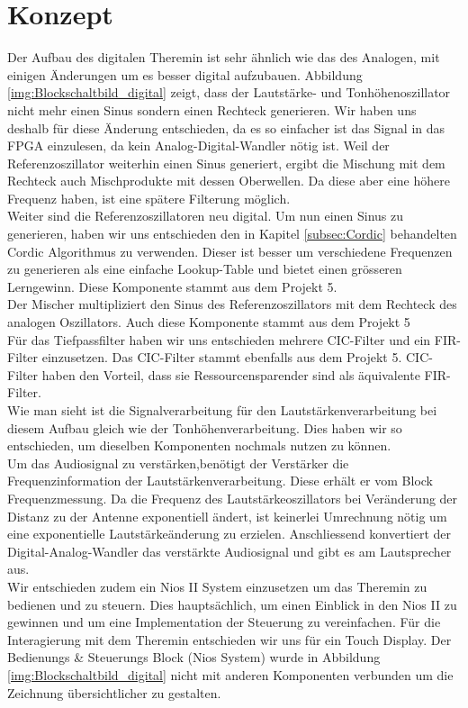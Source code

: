 
\clearpage
\section{Konzept}\label{sec:Konzept}
Der Aufbau des digitalen Theremin ist sehr ähnlich wie das des Analogen, mit einigen Änderungen um es besser digital aufzubauen. Abbildung \ref{img:Blockschaltbild_digital} zeigt, dass der Lautstärke- und Tonhöhenoszillator nicht mehr einen Sinus sondern einen Rechteck generieren. Wir haben uns deshalb für diese Änderung entschieden, da es so einfacher ist das Signal in das FPGA einzulesen, da kein Analog-Digital-Wandler nötig ist. Weil der Referenzoszillator weiterhin einen Sinus generiert, ergibt die Mischung mit dem Rechteck auch Mischprodukte mit dessen Oberwellen. Da diese aber eine höhere Frequenz haben, ist eine spätere Filterung möglich.\\
Weiter sind die Referenzoszillatoren neu digital. Um nun einen Sinus zu generieren, haben wir uns entschieden den in Kapitel \ref{subsec:Cordic} behandelten Cordic Algorithmus zu verwenden. Dieser ist besser um verschiedene Frequenzen zu generieren als eine einfache Lookup-Table und bietet einen grösseren Lerngewinn. Diese Komponente stammt aus dem Projekt 5. \\
Der Mischer multipliziert den Sinus des Referenzoszillators mit dem Rechteck des analogen Oszillators. Auch diese Komponente stammt aus dem Projekt 5\\
Für das Tiefpassfilter haben wir uns entschieden mehrere CIC-Filter und ein FIR-Filter einzusetzen. Das CIC-Filter stammt ebenfalls aus dem Projekt 5. CIC-Filter haben den Vorteil, dass sie Ressourcensparender sind als äquivalente FIR-Filter.\\
Wie man sieht ist die Signalverarbeitung für den Lautstärkenverarbeitung bei diesem Aufbau gleich wie der Tonhöhenverarbeitung. Dies haben wir so entschieden, um dieselben Komponenten nochmals nutzen zu können.\\
Um das Audiosignal zu verstärken,benötigt der Verstärker die Frequenzinformation der Lautstärkenverarbeitung. Diese erhält er vom Block Frequenzmessung. Da die Frequenz des Lautstärkeoszillators bei Veränderung der Distanz zu der Antenne exponentiell ändert, ist keinerlei Umrechnung nötig um eine exponentielle Lautstärkeänderung zu erzielen.
Anschliessend konvertiert der Digital-Analog-Wandler das verstärkte Audiosignal und gibt es am Lautsprecher aus.\\
Wir entschieden zudem ein Nios II System einzusetzen um das Theremin zu bedienen und zu steuern. Dies hauptsächlich, um einen Einblick in den Nios II zu gewinnen und um eine Implementation der Steuerung zu vereinfachen. Für die Interagierung mit dem Theremin entschieden wir uns für ein Touch Display. Der Bedienungs \& Steuerungs Block (Nios System) wurde in Abbildung \ref{img:Blockschaltbild_digital} nicht mit anderen Komponenten verbunden um die Zeichnung übersichtlicher zu gestalten.

